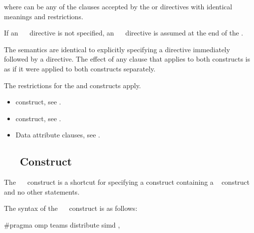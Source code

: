 {{{{where  can be any of the clauses accepted by the  or  
directives with identical meanings and restrictions.

If an ~~ directive is not specified, an 
~~ directive is assumed at the end of the .
\fortranspecificend

\descr
The semantics are identical to explicitly specifying a  directive immediately 
followed by a  directive. The effect of any clause that applies to both constructs is as if it were applied to both constructs separately.


\restrictions
The restrictions for the  and  constructs apply.

\crossreferences
\begin{itemize}
\item {} construct, see 
.

\item {} construct, see 
.

\item Data attribute clauses, see 
.
\end{itemize}












\subsection{~~ Construct}
\label{subsec:teams distribute simd Construct}
\summary
The ~~ construct is a shortcut for specifying a  construct 
containing a ~ construct and no other statements.

\syntax
\ccppspecificstart
The syntax of the ~~ construct is as follows:

\begin{boxedcode}
\#pragma omp teams distribute simd \plc{[clause[ [},\plc{] clause] ... ] new-line}
\end{boxedcode}

}}}}
